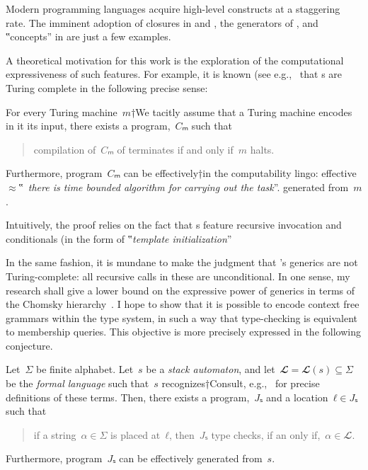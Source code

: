 Modern programming languages acquire high-level constructs
  at a staggering rate.
The imminent adoption of closures in \Java and \CC,
  the generators of \CSharp, and ‟concepts” in
  \CC are just a few examples.

A theoretical motivation for this work
  is the exploration of the computational
  expressiveness of such features.
For example, it is known (see e.g.,~\cite{Gil:Gutterman:2003} that
  s are Turing complete in the following precise sense:

\begin{Theorem}
  \label{Theorem:Gutterman}
For every Turing machine~$m$†{We tacitly assume that a Turing machine
  encodes in it its input}, there exists a \CC program,~$Cₘ$ such that
\begin{quote}
  compilation of~$Cₘ$ of terminates if and only if~$m$ halts.
\end{quote}
Furthermore, program~$Cₘ$ can be effectively†{in the computability lingo:
  effective~$≈$‟~\emph{there is time
  bounded algorithm for carrying out the task}”.} generated from~$m$.
\end{Theorem}

Intuitively, the proof relies on the fact that s
  feature recursive invocation and conditionals (in the form of
  ‟\emph{template initialization}”

In the same fashion, it is mundane to make the judgment that
  \Java's generics are not Turing-complete: all recursive calls
  in these are unconditional.
In one sense, my research shall give a lower bound on the
  expressive power of \Java generics in terms of the Chomsky hierarchy~\cite{Chomsky:1963}.
I hope to show that it is possible to encode context free grammars within the \Java type system,
  in such a way that type-checking is equivalent to membership queries.
This objective is more precisely expressed in the following conjecture.

\begin{Conjecture}
\label{Conjecture:Gil:Levy}
Let~$Σ$ be finite alphabet.
  Let~$s$ be a \emph{stack automaton}, and let~$𝓛=𝓛(s)⊆Σ$ be
  the \emph{formal language} such that~$s$ recognizes†{Consult, e.g.,~\cite{Automatim} for precise definitions of these terms}.
Then, there exists a \Java program,~$Jₛ$ and a location~$ℓ∈Jₛ$
such that 
\begin{quote}
  if a string~$α∈Σ$ is
  placed at~$ℓ$, then~$Jₛ$ type checks, if an only if,~$α∈𝓛$.
\end{quote}
Furthermore, program~$Jₛ$ can be effectively generated from~$s$.
\end{Conjecture}

